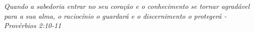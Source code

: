\begin{epigrafe}
    \vspace*{\fill}
	\begin{flushright}
		\textit{Quando a sabedoria entrar no seu coração e o conhecimento se tornar agradável para a sua alma, o raciocínio o guardará e o discernimento o protegerá - Provérbios 2:10-11}
	\end{flushright}
\end{epigrafe}

